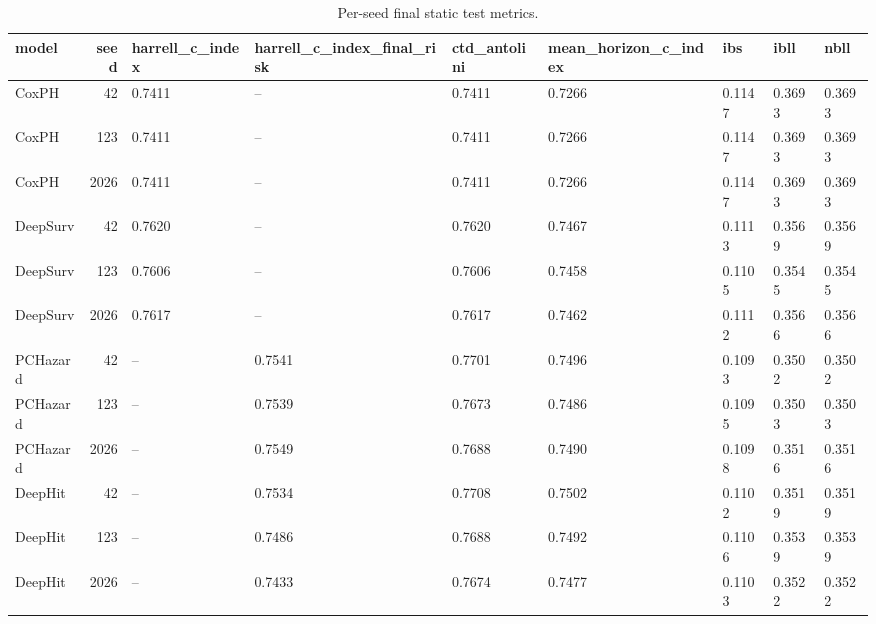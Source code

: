 \begin{table}
\caption{Per-seed final static test metrics.}
\label{tab:static_per_seed_results}
\begin{tabular}{lrlllllll}
\toprule
model & seed & harrell_c_index & harrell_c_index_final_risk & ctd_antolini & mean_horizon_c_index & ibs & ibll & nbll \\
\midrule
CoxPH & 42 & 0.7411 & -- & 0.7411 & 0.7266 & 0.1147 & 0.3693 & 0.3693 \\
CoxPH & 123 & 0.7411 & -- & 0.7411 & 0.7266 & 0.1147 & 0.3693 & 0.3693 \\
CoxPH & 2026 & 0.7411 & -- & 0.7411 & 0.7266 & 0.1147 & 0.3693 & 0.3693 \\
DeepSurv & 42 & 0.7620 & -- & 0.7620 & 0.7467 & 0.1113 & 0.3569 & 0.3569 \\
DeepSurv & 123 & 0.7606 & -- & 0.7606 & 0.7458 & 0.1105 & 0.3545 & 0.3545 \\
DeepSurv & 2026 & 0.7617 & -- & 0.7617 & 0.7462 & 0.1112 & 0.3566 & 0.3566 \\
PCHazard & 42 & -- & 0.7541 & 0.7701 & 0.7496 & 0.1093 & 0.3502 & 0.3502 \\
PCHazard & 123 & -- & 0.7539 & 0.7673 & 0.7486 & 0.1095 & 0.3503 & 0.3503 \\
PCHazard & 2026 & -- & 0.7549 & 0.7688 & 0.7490 & 0.1098 & 0.3516 & 0.3516 \\
DeepHit & 42 & -- & 0.7534 & 0.7708 & 0.7502 & 0.1102 & 0.3519 & 0.3519 \\
DeepHit & 123 & -- & 0.7486 & 0.7688 & 0.7492 & 0.1106 & 0.3539 & 0.3539 \\
DeepHit & 2026 & -- & 0.7433 & 0.7674 & 0.7477 & 0.1103 & 0.3522 & 0.3522 \\
\bottomrule
\end{tabular}
\end{table}
